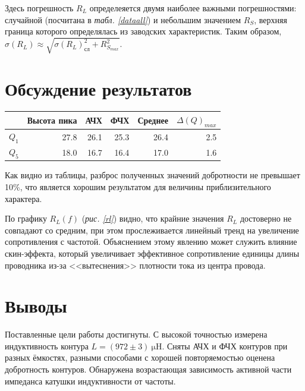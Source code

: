 \documentclass[12pt, a4paper]{article}
\begin{document}
Здесь погрешность $R_L$ определеяется двумя наиболее важными погрешностями: случайной (посчитана в \textit{табл. \ref{dataall}}) и небольшим значением $R_S$, верхняя граница которого определялась из заводских характеристик. Таким образом, $\sigma (R_L) \approx \sqrt{\sigma(R_L)_{сл}^2 + R_{S_{max}}^2}$.


\section{Обсуждение результатов}
\begin{table}[H]
  \begin{tabular}{|l|r|r|r|r|r|}
    \hline
    & \multicolumn{1}{l|}{Высота пика} & \multicolumn{1}{l|}{АЧХ} & \multicolumn{1}{l|}{ФЧХ} & \multicolumn{1}{l|}{Среднее} & \multicolumn{1}{l|}{$\Delta(Q)_{max}$} \\ \hline
    $Q_1$ & 27.8                             & 26.1                     & 25.3                     & 26.4                         & 2.5                              \\ \hline
    $Q_5$ & 18.0                             & 16.7                     & 16.4                     & 17.0                         & 1.6                              \\ \hline
  \end{tabular}
\end{table}

Как видно из таблицы, разброс полученных значений добротности не превышает 10\%, что является хорошим результатом для величины приблизительного характера.

По графику $R_L (f)$ (\textit{рис. \ref{rl}}) видно, что крайние значения $R_L$ достоверно не совпадают со средним, при этом прослеживается линейный тренд на увеличение сопротивления с частотой. Объяснением этому явлению может служить влияние скин-эффекта, который увеличивает эффективное сопротивление единицы длины проводника из-за <<вытеснения>> плотности тока из центра провода.
\section{Выводы}
Поставленные цели работы достигнуты. С высокой точностью измерена индуктивность контура $L = (972 \pm 3)~\mathrm{\mu H}$. Сняты АЧХ и ФЧХ контуров при разных ёмкостях, разными способами с хорошей повторяемостью оценена добротность контуров. Обнаружена возрастающая зависимость активной части импеданса катушки индуктивности от частоты.
\end{document}
